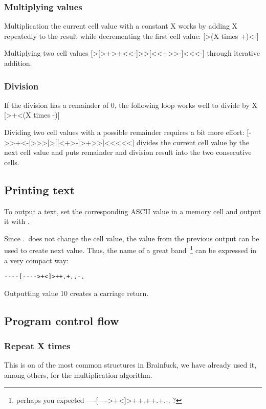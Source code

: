 \documentclass[ms,article,a4paper]{memoir}
\begin{document}
\subsubsection{Multiplying values}

Multiplication the current cell value with a constant X works by adding X repeatedly to the result while decrementing the first cell value: [>(X times +)<-]

Multiplying two cell values [>[>+>+<<-]>>[<<+>>-]<<<-] through iterative addition.

\subsubsection{Division}

If the division has a remainder of 0, the following loop works well to divide by X [>+<(X times -)]

Dividing two cell values with a possible remainder requires a bit more effort: [->>+<-[>>>]>[[<+>-]>+>>]<<<<<] divides the current cell value by the next cell value and puts remainder and division result into the two consecutive cells. 

\subsection{Printing text}

To output a text, set the corresponding ASCII value in a memory cell and output it with .

Since .\ does not change the cell value, the value from the previous output can be used to create next value. Thus, the name of a great band~\footnote{perhaps you expected ----[---->+<]>++.++.+.-. ?} can be expressed in a very compact way: 

\begin{verbatim}
----[---->+<]>++.+..-.
\end{verbatim}

Outputting value 10 creates a carriage return.

\subsection{Program control flow}

\subsubsection{Repeat X times}

This is on of the most common structures in Brainfuck, we have already used it, among others, for the multiplication algorithm.
\end{document}
